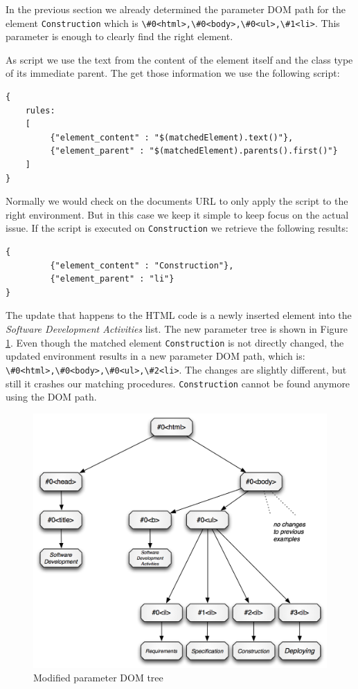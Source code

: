 In the previous section we already determined the parameter DOM path for the element \verb^Construction^ which is \verb^\#0<html>,\#0<body>,\#0<ul>,\#1<li>^. This parameter is enough to clearly find the right element. 

As script we use the text from the content of the element itself and the class type of its immediate parent. The get those information we use the following script:
\begin{lstlisting}
{
    rules:
    [
         {"element_content" : "$(matchedElement).text()"},
         {"element_parent" : "$(matchedElement).parents().first()"}
    ]
}
\end{lstlisting}

Normally we would check on the documents URL to only apply the script to the right environment. But in this case we keep it simple to keep focus on the actual issue. If the script is executed on \verb^Construction^ we retrieve the following results:

\begin{lstlisting}
{
         {"element_content" : "Construction"},
         {"element_parent" : "li"}
}
\end{lstlisting}

The update that happens to the HTML code is a newly inserted element into the \emph{Software Development Activities} list. The new parameter tree is shown in Figure \ref{dom-paramaterized-modified-tree-example}. Even though the matched element \verb^Construction^ is not directly changed, the updated environment results in a new parameter DOM path, which is:
\verb^\#0<html>,\#0<body>,\#0<ul>,\#2<li>^. The changes are slightly different, but still it crashes our matching procedures. \verb^Construction^ cannot be found anymore using the DOM path. 


\begin{figure}\centering
		\includegraphics[width=13cm]{images/dom-paramaterized-modified-tree-example.png}
		\caption{Modified parameter DOM tree}
		\label{dom-paramaterized-modified-tree-example}
\end{figure} 

